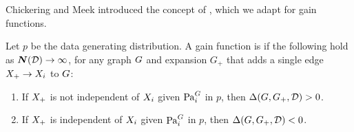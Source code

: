 \documentclass{article}
\begin{document}
%
Chickering and Meek %
introduced the concept of  , which we adapt for %
gain functions.

\begin{definition}
 Let $p$ be the data generating distribution. A gain function is  if the following hold %
 as $\boldsymbol{N}(\mathcal{D}) \rightarrow \infty$, for any graph $G$ and expansion $G_{+}$ that adds a single edge $X_{+} \rightarrow X_{i}$ to $G$:



\begin{enumerate}
\small
\item If $X_{+}$ is not independent of $X_{i}$ given  $\mathrm{Pa}_{i}^{G}$ in $p$, then $\Delta(G,G_{+},\mathcal{D}) > 0$. \label{clause:consistency}
\item If $X_{+}$ is independent of $X_{i}$ given  $\mathrm{Pa}_{i}^{G}$ in $p$, then $\Delta(G,G_{+},\mathcal{D}) < 0$. \label{clause:optimality}
\end{enumerate}

\end{definition}
%
\end{document}
